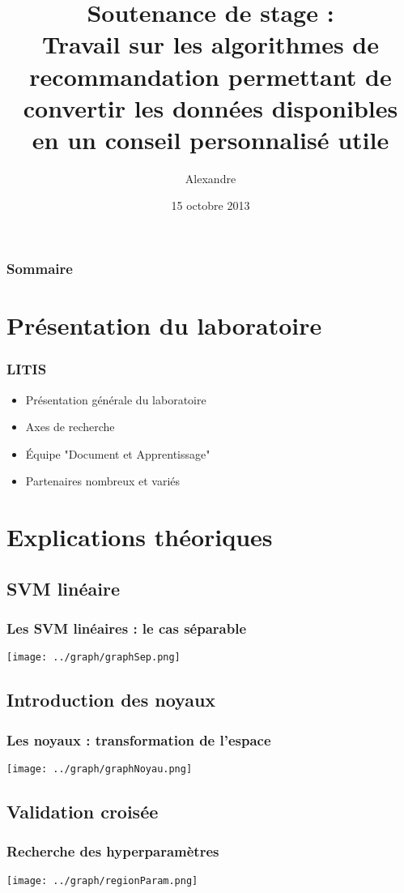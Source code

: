 \documentclass{beamer}
\title[Soutenance de stage]{Soutenance de stage : \\Travail sur les algorithmes de recommandation permettant de convertir les données disponibles en un conseil personnalisé utile}
\author{Alexandre \bsc{Vieira}}
\institute{INSA de Rouen}
\date{15 octobre 2013}
\begin{document}
\begin{frame}
\titlepage
\end{frame}

\begin{frame}
	\frametitle{Sommaire}
	\tableofcontents
\end{frame}

\section[Laboratoire]{Présentation du laboratoire}
 
\begin{frame}
	\frametitle{LITIS}
	\begin{itemize}
		\item Présentation générale du laboratoire
		\item Axes de recherche
		\item Équipe "Document et Apprentissage"
		\item Partenaires nombreux et variés
	\end{itemize}
\end{frame}

\section[Théorique]{Explications théoriques}
\subsection{SVM linéaire}
\begin{frame}
	\frametitle{Les SVM linéaires : le cas séparable}
	\texttt{[image: ../graph/graphSep.png]}
\end{frame}

\subsection[Noyaux]{Introduction des noyaux}
\begin{frame}
	\frametitle{Les noyaux : transformation de l'espace}
	\begin{center}\texttt{[image: ../graph/graphNoyau.png]}\end{center}
\end{frame}

\subsection[CV]{Validation croisée}
\begin{frame}
	\frametitle{Recherche des hyperparamètres}
	\begin{center}\texttt{[image: ../graph/regionParam.png]}\end{center}
\end{frame}
\end{document}
